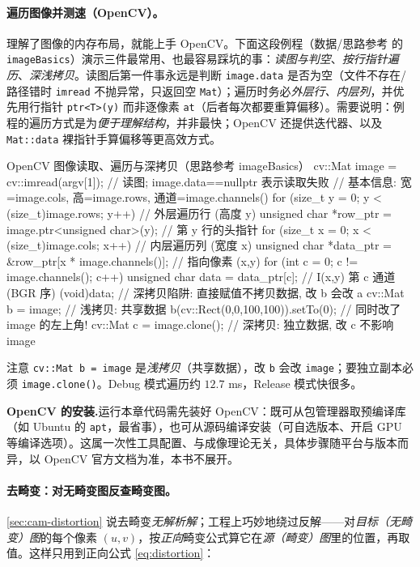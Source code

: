 \paragraph{遍历图像并测速（OpenCV）。}
理解了图像的内存布局，就能上手 OpenCV。下面这段例程（数据/思路参考\cite{gaoxiang2019slam14} 的 \texttt{imageBasics}）演示三件最常用、也最容易踩坑的事：\emph{读图与判空}、\emph{按行指针遍历}、\emph{深浅拷贝}。读图后第一件事永远是判断 \texttt{image.data} 是否为空（文件不存在/路径错时 \texttt{imread} 不抛异常，只返回空 \texttt{Mat}）；遍历时务必\emph{外层行、内层列}，并优先用行指针 \texttt{ptr<T>(y)} 而非逐像素 \texttt{at}（后者每次都要重算偏移）。需要说明：例程的遍历方式是为\emph{便于理解结构}，并非最快；OpenCV 还提供迭代器、以及 \texttt{Mat::data} 裸指针手算偏移等更高效方式。

\begin{codebox}[C++]{OpenCV 图像读取、遍历与深拷贝（思路参考 imageBasics）}
cv::Mat image = cv::imread(argv[1]);              // 读图; image.data==nullptr 表示读取失败
// 基本信息: 宽=image.cols, 高=image.rows, 通道=image.channels()
for (size_t y = 0; y < (size_t)image.rows; y++) { // 外层遍历行 (高度 y)
  unsigned char *row_ptr = image.ptr<unsigned char>(y);  // 第 y 行的头指针
  for (size_t x = 0; x < (size_t)image.cols; x++) {       // 内层遍历列 (宽度 x)
    unsigned char *data_ptr = &row_ptr[x * image.channels()]; // 指向像素 (x,y)
    for (int c = 0; c != image.channels(); c++) {
      unsigned char data = data_ptr[c];           // I(x,y) 第 c 通道 (BGR 序)
      (void)data;
    }
  }
}
// 深拷贝陷阱: 直接赋值不拷贝数据, 改 b 会改 a
cv::Mat b = image;            // 浅拷贝: 共享数据
b(cv::Rect(0,0,100,100)).setTo(0);   // 同时改了 image 的左上角!
cv::Mat c = image.clone();    // 深拷贝: 独立数据, 改 c 不影响 image
\end{codebox}

\noindent 注意 \texttt{cv::Mat b = image} 是\emph{浅拷贝}（共享数据），改 \texttt{b} 会改 \texttt{image}；要独立副本必须 \texttt{image.\allowbreak clone()}。Debug 模式遍历约 $12.7$ ms，Release 模式快很多\cite{gaoxiang2019slam14}。

\begin{note}
\textbf{OpenCV 的安装.}\;运行本章代码需先装好 OpenCV：既可从包管理器取预编译库（如 Ubuntu 的 \texttt{apt}，最省事），也可从源码编译安装（可自选版本、开启 GPU 等编译选项）。这属一次性工具配置、与成像理论无关，具体步骤随平台与版本而异，以 OpenCV 官方文档为准，本书不展开。
\end{note}

\paragraph{去畸变：对无畸变图反查畸变图。}
\cref{sec:cam-distortion} 说去畸变\emph{无解析解}；工程上巧妙地绕过反解——对\emph{目标（无畸变）图}的每个像素 $(u,v)$，按\emph{正向}畸变公式算它在\emph{源（畸变）图}里的位置，再取值。这样只用到正向公式 \cref{eq:distortion}：

